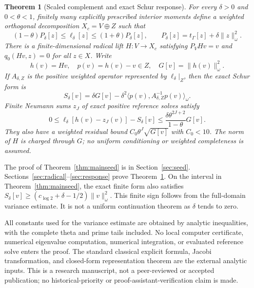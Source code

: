 \documentclass[11pt,a4paper]{article}
\numberwithin{equation}{section}
\newtheorem{theorem}{Theorem}[section]
\theoremstyle{remark}
\newcommand{\tg}{t_{\Gamma}}
\newcommand{\ip}[2]{\langle #1,#2\rangle}
\newcommand{\norm}[1]{\lVert #1\rVert}
\begin{document}
\begin{theorem}[Scaled complement and exact Schur response]\label{thm:mainschur}
For every $\delta>0$ and $0<\theta<1$, finitely many explicitly prescribed interior moments define a weighted orthogonal decomposition $X_c=V\oplus Z$ such that
\begin{equation}\label{eq:maincomparison}
 (1-\theta)P_\delta[z]\le\ell_\delta[z]
 \le(1+\theta)P_\delta[z],\qquad
 P_\delta[z]=\tg[z]+\delta\norm{z}_\omega^2.
\end{equation}
There is a finite-dimensional radical lift $H:V\to X_c$ satisfying $P_VHv=v$ and $q_0(Hv,z)=0$ for all $z\in X$. Write
\[
 h(v)=Hv,\quad p(v)=h(v)-v\in Z,\quad G[v]=\norm{h(v)}_\omega^2.
\]
If $A_{\delta,Z}$ is the positive weighted operator represented by $\ell_\delta|_Z$, then the exact Schur form is
\begin{equation}\label{eq:mainschur}
 S_\delta[v]=\delta G[v]
    -\delta^2\ip{p(v)}{A_{\delta,Z}^{-1}p(v)}_\omega.
\end{equation}
Finite Neumann sums $z_J$ of exact positive reference solves satisfy
\begin{equation}\label{eq:mainerror}
 0\le\ell_\delta[h(v)-z_J(v)]-S_\delta[v]
 \le\frac{\delta\theta^{2J+2}}{1-\theta}G[v].
\end{equation}
They also have a weighted residual bound $C_0\theta^J\sqrt{G[v]}$ with $C_0<10$. The norm of $H$ is charged through $G$; no uniform conditioning or weighted completeness is assumed.
\end{theorem}

The proof of Theorem~\ref{thm:mainseed} is in Section~\ref{sec:seed}. Sections~\ref{sec:radical}--\ref{sec:response} prove Theorem~\ref{thm:mainschur}. On the interval in Theorem~\ref{thm:mainseed}, the exact finite form also satisfies
$S_\delta[v]\ge(c_{\log 2}+\delta-1/2)\norm v_\omega^2$.
This finite sign follows from the full-domain variance estimate. It is not a uniform continuation theorem as $\delta$ tends to zero.

All constants used for the variance estimate are obtained by analytic inequalities, with the complete theta and prime tails included. No local computer certificate, numerical eigenvalue computation, numerical integration, or evaluated reference solve enters the proof. The standard classical explicit formula, Jacobi transformation, and closed-form representation theorem are the external analytic inputs. This is a research manuscript, not a peer-reviewed or accepted publication; no historical-priority or proof-assistant-verification claim is made.
\end{document}
